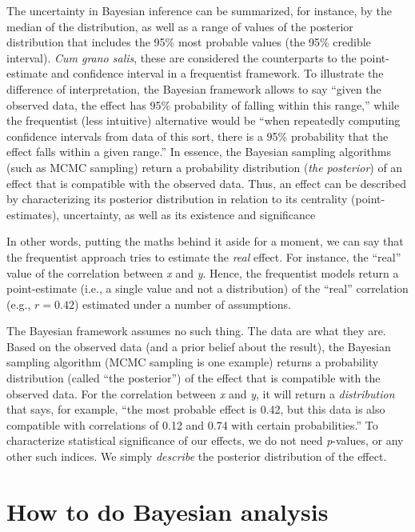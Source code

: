 \documentclass[10pt,a4paper,onecolumn]{article}
\begin{document}
The uncertainty in Bayesian inference can be summarized, for instance,
by the median of the distribution, as well as a range of values of the
posterior distribution that includes the 95\% most probable values (the
95\% credible interval). \emph{Cum grano salis}, these are considered
the counterparts to the point-estimate and confidence interval in a
frequentist framework. To illustrate the difference of interpretation,
the Bayesian framework allows to say ``given the observed data, the
effect has 95\% probability of falling within this range,'' while the
frequentist (less intuitive) alternative would be ``when repeatedly
computing confidence intervals from data of this sort, there is a 95\%
probability that the effect falls within a given range.'' In essence,
the Bayesian sampling algorithms (such as MCMC sampling) return a
probability distribution (\emph{the posterior}) of an effect that is
compatible with the observed data. Thus, an effect can be described by
characterizing its posterior distribution in relation to its centrality
(point-estimates), uncertainty, as well as its existence and
significance

In other words, putting the maths behind it aside for a moment, we can
say that the frequentist approach tries to estimate the \emph{real}
effect. For instance, the ``real'' value of the correlation between
\emph{x} and \emph{y}. Hence, the frequentist models return a
point-estimate (i.e., a single value and not a distribution) of the
``real'' correlation (e.g., \(r = 0.42\)) estimated under a number of
assumptions.

The Bayesian framework assumes no such thing. The data are what they
are. Based on the observed data (and a prior belief about the result),
the Bayesian sampling algorithm (MCMC sampling is one example) returns a
probability distribution (called ``the posterior'') of the effect that
is compatible with the observed data. For the correlation between
\emph{x} and \emph{y}, it will return a \emph{distribution} that says,
for example, ``the most probable effect is 0.42, but this data is also
compatible with correlations of 0.12 and 0.74 with certain
probabilities.'' To characterize statistical significance of our
effects, we do not need \emph{p}-values, or any other such indices. We
simply \emph{describe} the posterior distribution of the effect.

\hypertarget{how-to-do-bayesian-analysis}{%
\section{How to do Bayesian
analysis}\label{how-to-do-bayesian-analysis}}
\end{document}
